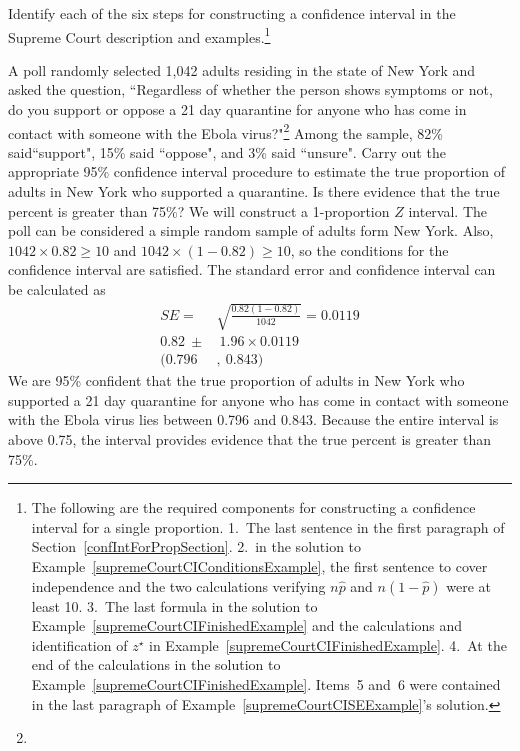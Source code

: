 \begin{exercise}
Identify each of the six steps for constructing a confidence interval in the Supreme Court description and examples.\footnote{The following are the required components for constructing a confidence interval for a single proportion. 1.~The last sentence in the first paragraph of Section~\ref{confIntForPropSection}. 2.~in the solution to Example~\ref{supremeCourtCIConditionsExample}, the first sentence to cover independence and the two calculations verifying $n\hat{p}$ and $n(1-\hat{p})$ were at least 10. 3.~The last formula in the solution to Example~\ref{supremeCourtCIFinishedExample} and the calculations and identification of $z^{\star}$ in Example~\ref{supremeCourtCIFinishedExample}. 4.~At the end of the calculations in the solution to Example~\ref{supremeCourtCIFinishedExample}. Items~5 and~6 were contained in the last paragraph of Example~\ref{supremeCourtCISEExample}'s solution.}
\end{exercise}

\begin{example}{A poll randomly selected 1,042 adults residing in the state of New York and asked the question, ``Regardless of whether the person shows symptoms or not, do you support or oppose a 21 day quarantine for anyone who has come in contact with someone with the Ebola virus?"\footnote{} Among the sample, 82\% said``support", 15\% said ``oppose", and 3\% said ``unsure". Carry out the appropriate 95\% confidence interval procedure to estimate the true proportion of adults in New York who supported a quarantine.  Is there evidence that the true percent is greater than 75\%?}
We will construct a 1-proportion $Z$ interval.  The poll can be considered a simple random sample of adults form New York.  Also, $1042\times 0.82\ge10$ and $1042\times (1-0.82)\ge10$, so the conditions for the confidence interval are satisfied. The standard error and confidence interval can be calculated as
\begin{align*}
SE=&\sqrt{\frac{0.82(1-0.82)}{1042}}=0.0119 \\
0.82\ \pm&\  1.96 \times 0.0119 \\
(0.796&,\ 0.843)
\end{align*}
We are 95\% confident that the true proportion of adults in New York who supported a 21 day quarantine for anyone who has come in contact with someone with the Ebola virus lies between 0.796 and 0.843.  Because the entire interval is above 0.75, the interval provides evidence that the true percent is greater than 75\%.
\end{example}

